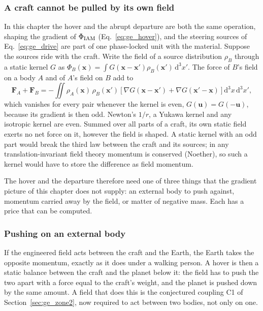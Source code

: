 \subsubsection{A craft cannot be pulled by its own field}
In this chapter the hover and the abrupt departure are both the same operation, shaping the gradient of $\Phi_{\rm IAM}$
(Eq.~\eqref{eq:ge_hover}), and the steering sources of Eq.~\eqref{eq:ge_drive} are part of one phase-locked unit with the material. Suppose the
sources ride with the craft. Write the field of a source distribution $\rho_B$ through a static kernel $G$ as
$\Phi_B(\mathbf x)=\int G(\mathbf x-\mathbf x')\rho_B(\mathbf x')\,\mathrm d^3x'$. The force of $B$'s field on a body $A$ and of $A$'s field on $B$ add to
\begin{equation}
\mathbf F_A+\mathbf F_B=-\iint\rho_A(\mathbf x)\,\rho_B(\mathbf x')\left[\nabla G(\mathbf x-\mathbf x')+\nabla G(\mathbf x'-\mathbf x)\right]\mathrm d^3x\,\mathrm d^3x' ,
\label{eq:pr_noforce}
\end{equation}
which vanishes for every pair whenever the kernel is even, $G(\mathbf u)=G(-\mathbf u)$, because its gradient is then odd. Newton's $1/r$, a Yukawa
kernel and any isotropic kernel are even. Summed over all parts of a craft, its own static field exerts no net force on it, however the field is
shaped. \derived{} A static kernel with an odd part would break the third law between the craft and its sources; in any translation-invariant field
theory momentum is conserved (Noether), so such a kernel would have to store the difference as field momentum. \derived

The hover and the departure therefore need one of three things that the gradient picture of this chapter does not supply: an
external body to push against, momentum carried away by the field, or matter of negative mass. Each has a price that can be computed. \derived

\subsubsection{Pushing on an external body}
If the engineered field acts between the craft and the Earth, the Earth takes the opposite momentum, exactly as it does under a walking person. A
hover is then a static balance between the craft and the planet below it: the field has to push the two apart with a force equal to the craft's
weight, and the planet is pushed down by the same amount. \derived{} A field that does this is the conjectured
coupling C1 of Section~\ref{sec:ge_zone2}, now required to act between two bodies, not only on one. \conjecture

